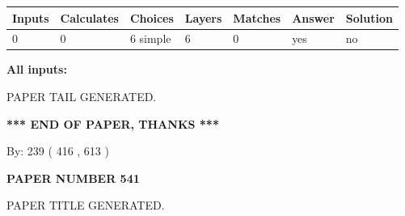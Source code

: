 \documentclass[12pt]{article}
\begin{document}
   
   
   
\noindent\begin{tabular}{|l|l|l|l|l|l|l|}
 \hline
Inputs & Calculates & Choices & Layers & Matches & Answer & Solution \\ \hline
 0  & 
 0  & 
 6
  simple  
  & 
 6  & 
 0  & 
  yes & 
  no 
  \\ \hline
 \end{tabular}
   
   
   
   
\noindent{}
   
   
   
   
\noindent\vspace{0.1in}\hspace{-0.08in} {\textbf{\Large{All inputs: }}}
   
   
   
   
   
   
 \vspace{0.2in}
 
   
   
\vspace{2.0in} PAPER TAIL GENERATED.
   
   
   
   
\vspace{1.0in} 
{\textbf{\large{ *** END OF PAPER, THANKS *** }}} 
   
   
\hspace{1.0in} By: 
 239 ( 416 ,  613 )
   
   
   
   
\newpage 
\setcounter{page}{ 
   541001 } 
   
   
   
   
 {\textbf{ \Large{ PAPER NUMBER  541  }}}
   
   
\vspace{0.2in}
   
   
   
   
   
   
   
   
 \vspace{0.2in}
 
 
 
 
   
   
 PAPER TITLE GENERATED.
   
   
   
\end{document}
